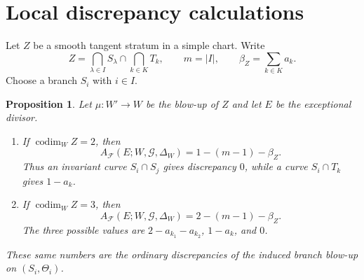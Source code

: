 \documentclass[11pt]{amsart}
\numberwithin{equation}{section}
\theoremstyle{plain}
\newtheorem{Proposition}[Theorem]{Proposition}
\theoremstyle{definition}
\newcommand{\codim}{\operatorname{codim}}
\newcommand{\AF}{A_{\mathcal F}}
\newcommand{\cG}{\mathcal G}
\begin{document}
\section{Local discrepancy calculations}
\label{sec:local-discrepancy}

Let $Z$ be a smooth tangent stratum in a simple chart.  Write
\[
Z=\bigcap_{\lambda\in I}S_\lambda\cap\bigcap_{k\in K}T_k,
\qquad m=|I|,
\qquad \beta_Z=\sum_{k\in K}a_k.
\]
Choose a branch $S_i$ with $i\in I$.

\begin{Proposition}
\label{prop:elementary-blowups}
Let $\mu:W'\to W$ be the blow-up of $Z$ and let $E$ be the exceptional divisor.
\begin{enumerate}[label=\textup{(\roman*)},leftmargin=2.4em]
\item If $\codim_W Z=2$, then
\[
\AF(E;W,\cG,\Delta_W)=1-(m-1)-\beta_Z.
\]
Thus an invariant curve $S_i\cap S_j$ gives discrepancy $0$, while a curve $S_i\cap T_k$ gives $1-a_k$.
\item If $\codim_W Z=3$, then
\[
\AF(E;W,\cG,\Delta_W)=2-(m-1)-\beta_Z.
\]
The three possible values are $2-a_{k_1}-a_{k_2}$, $1-a_k$, and $0$.
\end{enumerate}
These same numbers are the ordinary discrepancies of the induced branch blow-up on $(S_i,\Theta_i)$.
\end{Proposition}
\end{document}
